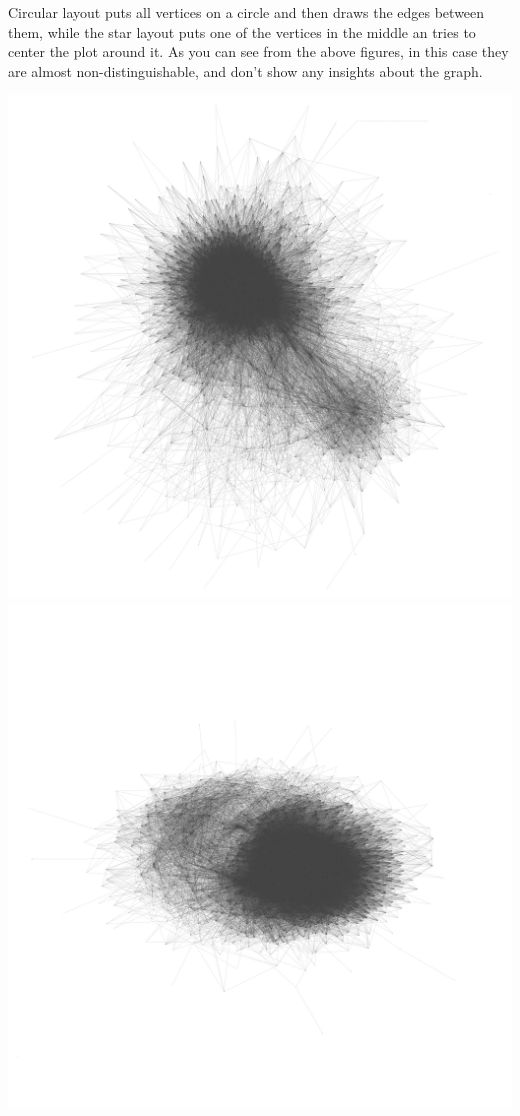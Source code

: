 \documentclass[12pt, a4paper]{article}
\begin{document}
\begin{multicols}{2}
{
\label{fig:hdg_c2}}
\end{multicols}

Circular layout puts all vertices on a circle and then draws the edges between them, while the star layout puts one of the vertices in the middle an tries to center the plot around it. As you can see from the above figures, in this case they are almost non-distinguishable, and don't show any insights about the graph.

\begin{multicols}{2}
{\centering
\includegraphics[width=\columnwidth]{src/youtube/hdg/hdg_simple}
\label{fig:hdg_simple}}
{\centering
\includegraphics[width=\columnwidth]{src/youtube/hdg/comp/5_plot_kk}\\
}
\end{multicols}
\end{document}
